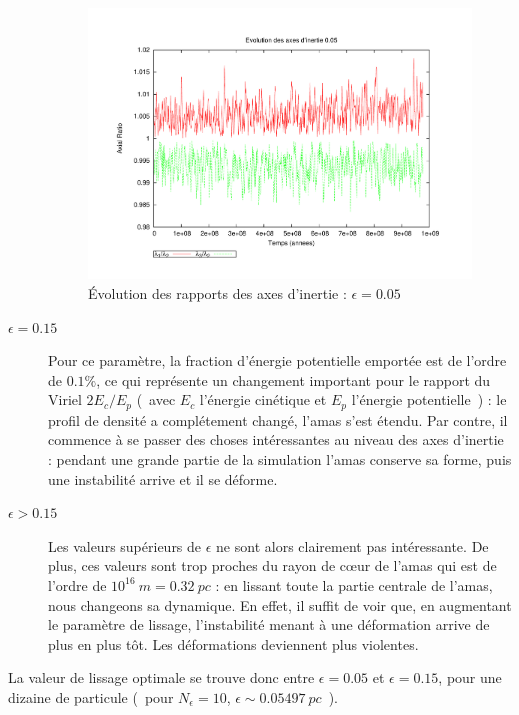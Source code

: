 \begin{description}
\begin{figure}[h!]
	\centering \includegraphics[scale=0.5]{graphe/Axial_ratio_0-05.pdf}
	\caption{Évolution des rapports des axes d'inertie : $\epsilon = 0.05$\label{soft::0.05-Ax}}
\end{figure}

	\item[$\epsilon = 0.15$]
	Pour ce paramètre, la fraction d'énergie potentielle emportée est de l'ordre de $0.1\%$, ce qui représente un changement important pour le rapport du Viriel $2 E_c/E_p$
	(~avec $E_c$ l'énergie cinétique et $E_p$ l'énergie potentielle~) : le profil de densité a complétement changé, l'amas s'est étendu.
	Par contre, il commence à se passer des choses intéressantes au niveau des axes d'inertie : pendant une grande partie de la simulation l'amas conserve sa forme, puis une instabilité arrive et il se déforme. %
	\item[$\epsilon > 0.15$]
	Les valeurs supérieurs de $\epsilon$ ne sont alors clairement pas intéressante. De plus, ces valeurs sont trop proches du rayon de cœur de l'amas qui est de l'ordre de $10^{16}\ m = 0.32\ pc$ : en lissant toute
	la partie centrale de l'amas, nous changeons sa dynamique. En effet, il suffit de voir que, en augmentant le paramètre de lissage, l'instabilité menant à une déformation arrive de plus en plus tôt.
	Les déformations deviennent plus violentes.
	\end{description}

	La valeur de lissage optimale se trouve donc entre $\epsilon = 0.05$ et $\epsilon = 0.15$, pour une dizaine de particule (~pour $N_\epsilon = 10$, $\epsilon \sim 0.05497\ pc$~).

